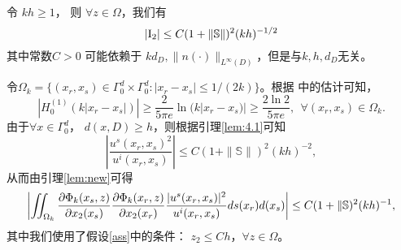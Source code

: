 \begin{lemma}\label{lem:4.3}
令 $kh\geq 1$， 则 $\forall z\in\Omega$，我们有
\begin{equation*}
|{\rm I}_2|\leq C(1 + \|\mathbb{S}\|)^2(kh)^{-1/2}
\end{equation*}
其中常数$C>0$ 可能依赖于 $kd_D,\|n(\cdot)\|_{L^{\infty}(D)}$，但是与$k,h,d_D$无关。
\end{lemma}
\debproof
令$\Omega_k=\{(x_r,x_s)\in \Gamma_0^d\times\Gamma_0^d: |x_r-x_s|\leq 1/(2k)\}$。根据\cite[Lemma 3.3]{ch_pha} 中的估计可知，
\begin{equation*}
    |H^{(1)}_0(k|x_r-x_s|)| \ge \frac 2{5\pi e}\ln(k|x_r-x_s)|\ge \frac{2\ln 2}{5\pi e},\ \ \forall (x_r,x_s)\in\Omega_k.
\end{equation*}
由于$\forall x\in\Gamma_0^d$， $d(x,D)\geq h$，则根据引理\ref{lem:4.1}可知
\begin{equation*}
 \left|
  \frac{u^s(x_r,x_s)^2}{u^i(x_r,x_s)}\right|\leq C(1+\|\mathbb{S}\|)^2(kh)^{-2},
\end{equation*}
从而由引理\ref{lem:new}可得
$$\label{I21}
\left|\int\hskip-6pt\int_{\Omega_k} \frac{\partial\Phi_k(x_s,z)}{\partial x_2(x_s)}\frac{\partial\Phi_k(x_r,z)}{\partial x_2(x_r)}
  \frac{|u^s(x_r,x_s)|^2}{u^i(x_r,x_s)}ds(x_r)d(x_s)\right|
\leq C(1+\|\mathbb{S})^2(kh)^{-1},
$$
其中我们使用了假设\eqref{ass}中的条件： $z_2\leq C h$，$\forall z\in\Omega$。

